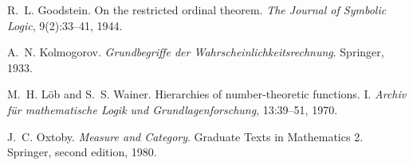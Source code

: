 
R.~L. Goodstein.
\newblock On the restricted ordinal theorem.
\newblock \emph{The Journal of Symbolic Logic}, 9(2):33--41, 1944.

A.~N. Kolmogorov.
\newblock \emph{Grundbegriffe der Wahrscheinlichkeitsrechnung}.
\newblock Springer, 1933.

M.~H. L\"ob and S.~S. Wainer.
\newblock Hierarchies of number-theoretic functions. I.
\newblock \emph{Archiv f\"ur mathematische Logik und Grundlagenforschung}, 13:39--51, 1970.

J.~C. Oxtoby.
\newblock \emph{Measure and Category}.
\newblock Graduate Texts in Mathematics 2. Springer, second edition, 1980.

